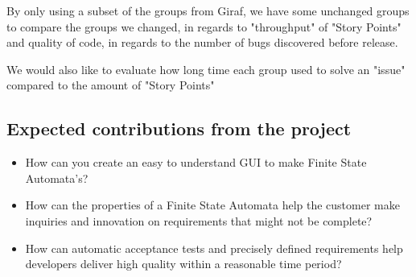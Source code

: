 By only using a subset of the groups from Giraf, we have some unchanged groups to compare the groups we changed, in regards to "throughput" of "Story Points" and quality of code, in regards to the number of bugs discovered before release.

We would also like to evaluate how long time each group used to solve an "issue" compared to the amount of "Story Points" 


\subsection{Expected contributions from the project}
\begin{itemize}
    \item How can you create an easy to understand GUI to make Finite State Automata's?
    \item How can the properties of a Finite State Automata help the customer make inquiries and innovation on requirements that might not be complete?
    \item How can automatic acceptance tests and precisely defined requirements help developers deliver high quality within a reasonable time period?
\end{itemize}
